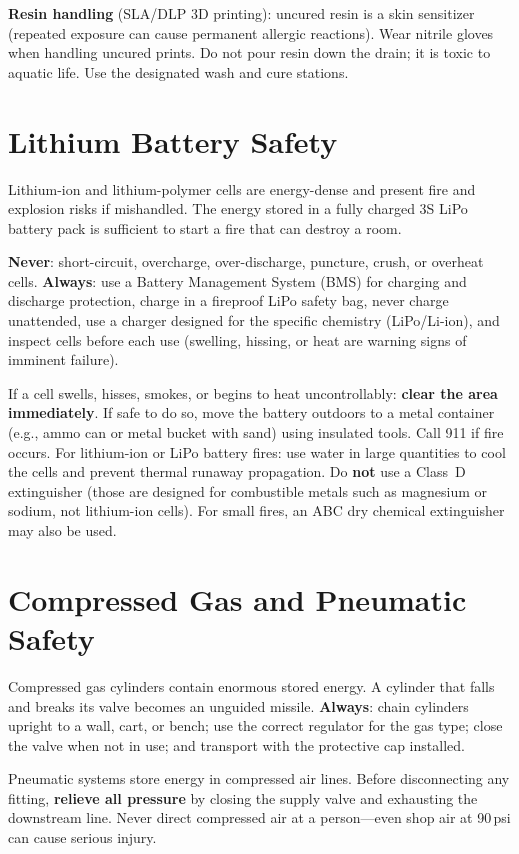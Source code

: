 \textbf{Resin handling} (SLA/DLP 3D printing): uncured resin is a skin sensitizer (repeated exposure can cause permanent allergic reactions). Wear nitrile gloves when handling uncured prints. Do not pour resin down the drain; it is toxic to aquatic life. Use the designated wash and cure stations.

\section{Lithium Battery Safety}
Lithium-ion and lithium-polymer cells are energy-dense and present fire and explosion risks if mishandled. The energy stored in a fully charged 3S LiPo battery pack is sufficient to start a fire that can destroy a room.

\textbf{Never}: short-circuit, overcharge, over-discharge, puncture, crush, or overheat cells. \textbf{Always}: use a Battery Management System (BMS) for charging and discharge protection, charge in a fireproof LiPo safety bag, never charge unattended, use a charger designed for the specific chemistry (LiPo/Li-ion), and inspect cells before each use (swelling, hissing, or heat are warning signs of imminent failure).

If a cell swells, hisses, smokes, or begins to heat uncontrollably: \textbf{clear the area immediately}. If safe to do so, move the battery outdoors to a metal container (e.g., ammo can or metal bucket with sand) using insulated tools. Call 911 if fire occurs. For lithium-ion or LiPo battery fires: use water in large quantities to cool the cells and prevent thermal runaway propagation. Do \textbf{not} use a Class~D extinguisher (those are designed for combustible metals such as magnesium or sodium, not lithium-ion cells). For small fires, an ABC dry chemical extinguisher may also be used.

\section{Compressed Gas and Pneumatic Safety}
Compressed gas cylinders contain enormous stored energy. A cylinder that falls and breaks its valve becomes an unguided missile. \textbf{Always}: chain cylinders upright to a wall, cart, or bench; use the correct regulator for the gas type; close the valve when not in use; and transport with the protective cap installed.

Pneumatic systems store energy in compressed air lines. Before disconnecting any fitting, \textbf{relieve all pressure} by closing the supply valve and exhausting the downstream line. Never direct compressed air at a person---even shop air at 90\,psi can cause serious injury.

